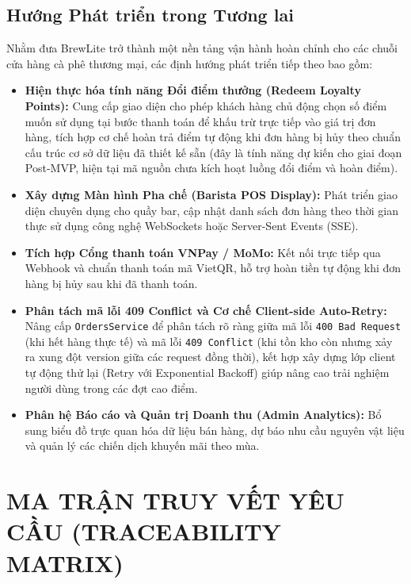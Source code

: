 \documentclass[12pt,a4paper,oneside]{report}
\begin{document}
\section{Hướng Phát triển trong Tương lai}
Nhằm đưa BrewLite trở thành một nền tảng vận hành hoàn chỉnh cho các chuỗi cửa hàng cà phê thương mại, các định hướng phát triển tiếp theo bao gồm:
\begin{itemize}
    \item \textbf{Hiện thực hóa tính năng Đổi điểm thưởng (Redeem Loyalty Points):} Cung cấp giao diện cho phép khách hàng chủ động chọn số điểm muốn sử dụng tại bước thanh toán để khấu trừ trực tiếp vào giá trị đơn hàng, tích hợp cơ chế hoàn trả điểm tự động khi đơn hàng bị hủy theo chuẩn cấu trúc cơ sở dữ liệu đã thiết kế sẵn (đây là tính năng dự kiến cho giai đoạn Post-MVP, hiện tại mã nguồn chưa kích hoạt luồng đổi điểm và hoàn điểm).
    \item \textbf{Xây dựng Màn hình Pha chế (Barista POS Display):} Phát triển giao diện chuyên dụng cho quầy bar, cập nhật danh sách đơn hàng theo thời gian thực sử dụng công nghệ WebSockets hoặc Server-Sent Events (SSE).
    \item \textbf{Tích hợp Cổng thanh toán VNPay / MoMo:} Kết nối trực tiếp qua Webhook và chuẩn thanh toán mã VietQR, hỗ trợ hoàn tiền tự động khi đơn hàng bị hủy sau khi đã thanh toán.
    \item \textbf{Phân tách mã lỗi 409 Conflict và Cơ chế Client-side Auto-Retry:} Nâng cấp \texttt{OrdersService} để phân tách rõ ràng giữa mã lỗi \texttt{400 Bad Request} (khi hết hàng thực tế) và mã lỗi \texttt{409 Conflict} (khi tồn kho còn nhưng xảy ra xung đột version giữa các request đồng thời), kết hợp xây dựng lớp client tự động thử lại (Retry với Exponential Backoff) giúp nâng cao trải nghiệm người dùng trong các đợt cao điểm.
    \item \textbf{Phân hệ Báo cáo và Quản trị Doanh thu (Admin Analytics):} Bổ sung biểu đồ trực quan hóa dữ liệu bán hàng, dự báo nhu cầu nguyên vật liệu và quản lý các chiến dịch khuyến mãi theo mùa.
\end{itemize}



\appendix

\chapter{MA TRẬN TRUY VẾT YÊU CẦU (TRACEABILITY MATRIX)}
\label{app:traceability-matrix}
\end{document}
